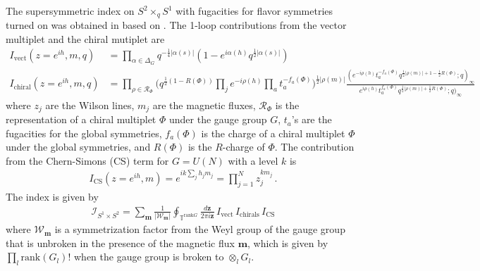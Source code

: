 \documentclass[11pt,hyper,a4paper]{article}
\begin{document}
The supersymmetric index on $S^2 \times_q S^1$ with fugacities for flavor symmetries turned on was obtained in \cite{Kapustin-Willett} based on \cite{KimS, Imamura-Yokoyama}.
The 1-loop contributions from the vector multiplet and the chiral mutiplet are
\begin{align}
I_{\text{vect}} (z =e^{i h }, m , q) &= \prod_{\alpha \in \Delta_G } q^{-\frac{1}{4} | \alpha(s) |} (1- e^{i \alpha(h)} q^{\frac{1}{2}|\alpha(s)|})	\\
I_{\text{chiral}} (z =e^{i h }, m , q) &= \prod_{\rho \in \mathcal{R}_{\Phi}} \big( q^{\frac{1}{2}(1-R(\Phi))} \prod_{j} e^{-i\rho(h)} \prod_{a} t_a^{-f_a(\Phi)} \big)^{\frac{1}{2}| \rho(m) | } 
\frac{(e^{-i\rho(h)} t_a^{-f_a(\Phi)} q^{\frac{1}{2} |\rho(m)| +1 -\frac{1}{2} R(\Phi)} ; q)_\infty}{e^{i\rho(h)} t_a^{f_a(\Phi)} q^{\frac{1}{2} |\rho(m)| + \frac{1}{2} R(\Phi)} ; q)_\infty}
\end{align}
where $z_j$ are the Wilson lines, $m_j$ are the magnetic fluxes, $\mathcal{R}_\Phi$ is the representation of a chiral multiplet $\Phi$ under the gauge group $G$, $t_a$'s are the fugacities for the global symmetries, $f_a(\Phi)$ is the charge of a chiral multiplet $\Phi$ under the global symmetries, and $R(\Phi)$ is the $R$-charge of $\Phi$.
The contribution from the Chern-Simons (CS) term for $G=U(N)$ with a level $k$ is
\begin{align}
I_{\text{CS}}(z=e^{ih}, m) = e^{i k \sum_{j} h_j m_j} = \prod^{N}_{j=1} z_j^{k m_j}	\,	.
\end{align}
The index is given by
\begin{align}
\mathcal{I}_{S^1 \times S^2} = \sum_{\mathbf{m}} \frac{1}{|\mathcal{W}_{\mathbf{m}}|} \oint_{\mathbb{T}^{\text{rank} G}} \frac{d\mathbf{z}}{2 \pi i \mathbf{z}} \, I_{\text{vect}} \, I_{\text{chirals}} \, I_{\text{CS}}
\end{align}
where $\mathcal{W}_{\mathbf{m}}$ is a symmetrization factor from the Weyl group of the gauge group that is unbroken in the presence of the magnetic flux $\mathbf{m}$, which is given by $\prod_{l} \text{rank}(G_l)!$ when the gauge group is broken to $\otimes_{l} G_l$.
\end{document}
